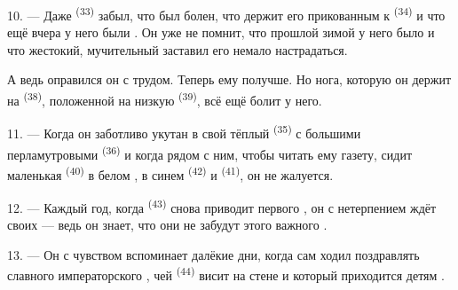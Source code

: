\VUsaut{4.2mm}
\VUsaut{3.0mm}

10. --- Даже  \textsuperscript{(33)} забыл, что был болен, что
 держит его прикованным к  \textsuperscript{(34)}
и что ещё вчера у него были . Он уже не помнит, что
прошлой зимой у него было  и что жестокий,
мучительный  заставил его немало настрадаться.

А ведь оправился он с трудом. Теперь ему получше. Но нога, которую он
держит на  \textsuperscript{(38)}, положенной на низкую
 \textsuperscript{(39)}, всё ещё болит у него.

11. --- Когда он заботливо укутан в свой тёплый 
\textsuperscript{(35)} с большими перламутровыми 
\textsuperscript{(36)} и когда рядом с ним, чтобы читать ему газету, сидит
маленькая  \textsuperscript{(40)} в белом , в
синем  \textsuperscript{(42)} и 
\textsuperscript{(41)}, он не жалуется.

12. --- Каждый год, когда  \textsuperscript{(43)} снова
приводит  первого , он с нетерпением ждёт
своих  --- ведь он знает, что они не забудут этого важного
.

13. --- Он с чувством вспоминает далёкие дни, когда сам ходил
поздравлять славного императорского , чей 
\textsuperscript{(44)} висит на стене и который приходится детям
.
\VUsaut{6.0mm}
\VUfilet{22mm}
